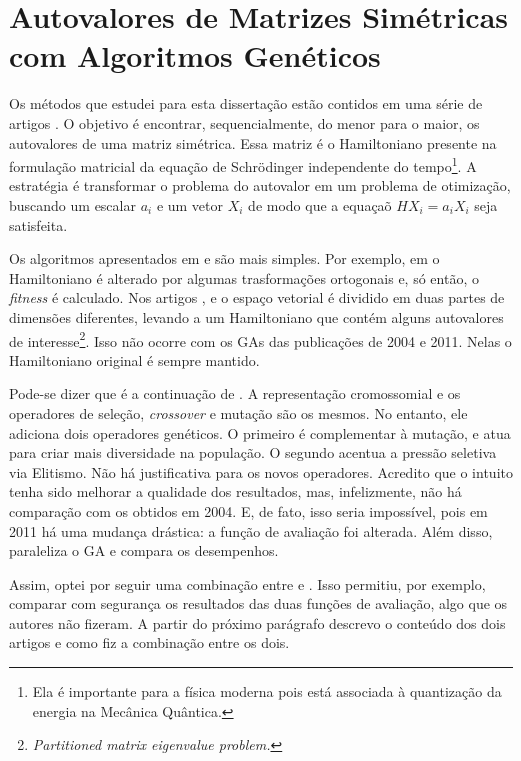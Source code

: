 \chapter{Autovalores de Matrizes Simétricas com Algoritmos Genéticos\label{sec:metodo}}

	Os métodos que estudei para esta dissertação estão contidos em uma série de artigos \cite{metodo2002, metodo2004, metodo2006, metodo2008, metodo2009, metodo2011}. O objetivo é encontrar, sequencialmente, do menor para o maior, os autovalores de uma matriz simétrica. Essa matriz é o Hamiltoniano presente na formulação matricial da equação de Schrödinger independente do tempo\footnote{Ela é importante para a física moderna pois está associada à quantização da energia na Mecânica Quântica.}. A estratégia é transformar o problema do autovalor em um problema de otimização, buscando um escalar $a_i$ e um vetor $X_i$ de modo que a equaçaõ $HX_i = a_iX_i$ seja satisfeita.
	
	Os algoritmos apresentados em \cite{metodo2004} e \cite{metodo2011} são mais simples. Por exemplo, em \cite{metodo2002} o Hamiltoniano é alterado por algumas trasformações ortogonais e, só então, o \emph{fitness} é calculado. Nos artigos \cite{metodo2006}, \cite{metodo2008} e \cite{metodo2009} o espaço vetorial é dividido em duas partes de dimensões diferentes, levando a um Hamiltoniano que contém alguns autovalores de interesse\footnote{\emph{Partitioned matrix eigenvalue problem.}}. Isso não ocorre com os GAs das publicações de 2004 e 2011. Nelas o Hamiltoniano original é sempre mantido.
	
	Pode-se dizer que \cite{metodo2011} é a continuação de \cite{metodo2004}. A representação cromossomial e os operadores de seleção, \emph{crossover} e mutação são os mesmos. No entanto, ele adiciona dois operadores genéticos. O primeiro é complementar à mutação, e atua para criar mais diversidade na população. O segundo acentua a pressão seletiva via Elitismo. Não há justificativa para os novos operadores. Acredito que o intuito tenha sido melhorar a qualidade dos resultados, mas, infelizmente, não há comparação com os obtidos em 2004. E, de fato, isso seria impossível, pois em 2011 há uma mudança drástica: a função de avaliação foi alterada. Além disso, \cite{metodo2011} paraleliza o GA e compara os desempenhos.
	
	Assim, optei por seguir uma combinação entre \cite{metodo2004} e \cite{metodo2011}. Isso permitiu, por exemplo, comparar com segurança os resultados das duas funções de avaliação, algo que os autores não fizeram. A partir do próximo parágrafo descrevo o conteúdo dos dois artigos e como fiz a combinação entre os dois.

